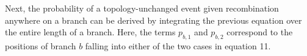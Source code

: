 \documentclass[11pt]{article}
\begin{document}

\noindent Next, the probability of a topology-unchanged event given recombination 
anywhere on a branch can be derived by integrating the previous equation 
over the entire length of a branch.
Here, the terms $p_{b,1}$ and $p_{b,2}$ correspond to the positions of branch 
$b$ falling into either of the two cases in equation 11.%

\end{document}
